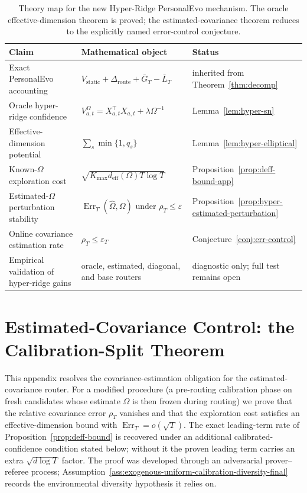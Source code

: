 \documentclass{article} %
\begin{document}
\begin{table}[h]
\centering
\small
\begin{tabular}{lll}
\toprule
Claim & Mathematical object & Status \\
\midrule
Exact PersonalEvo accounting & \(V_{\mathrm{static}}+\Delta_{\mathrm{route}}+\bar G_T-\bar L_T\) & inherited from Theorem~\ref{thm:decomp} \\
Oracle hyper-ridge confidence & \(V_{a,t}^{\Omega}=X_{a,t}^{\top}X_{a,t}+\lambda\Omega^{-1}\) & Lemma~\ref{lem:hyper-sn} \\
Effective-dimension potential & \(\sum_s \min\{1,q_s\}\) & Lemma~\ref{lem:hyper-elliptical} \\
Known-\(\Omega\) exploration cost & \(\sqrt{K_{\max}d_{\mathrm{eff}}(\Omega)T\log T}\) & Proposition~\ref{prop:deff-bound-app} \\
Estimated-\(\Omega\) perturbation stability & \(\operatorname{Err}_T(\widehat{\Omega},\Omega)\) under \(\rho_T\le\varepsilon\) & Proposition~\ref{prop:hyper-estimated-perturbation} \\
Online covariance estimation rate & \(\rho_T\le\varepsilon_T\) & Conjecture~\ref{conj:err-control} \\
Empirical validation of hyper-ridge gains & oracle, estimated, diagonal, and base routers & diagnostic only; full test remains open \\
\bottomrule
\end{tabular}
\caption{Theory map for the new Hyper-Ridge PersonalEvo mechanism.  The oracle effective-dimension theorem is proved; the estimated-covariance theorem reduces to the explicitly named error-control conjecture.}
\label{tab:hyper-theory-map}
\end{table}

\section{Estimated-Covariance Control: the Calibration-Split Theorem}
\label{app:err-control-proof}

This appendix resolves the covariance-estimation obligation for the estimated-covariance router. For a modified procedure (a pre-routing calibration phase on fresh candidates whose estimate $\widehat{\Omega}$ is then frozen during routing) we prove that the relative covariance error $\rho_T$ vanishes and that the exploration cost satisfies an effective-dimension bound with $\operatorname{Err}_T = o(\sqrt{T})$. The exact leading-term rate of Proposition~\ref{prop:deff-bound} is recovered under an additional calibrated-confidence condition stated below; without it the proven leading term carries an extra $\sqrt{d\log T}$ factor. The proof was developed through an adversarial prover--referee process; Assumption~\ref{ass:exogenous-uniform-calibration-diversity-final} records the environmental diversity hypothesis it relies on.
\end{document}
